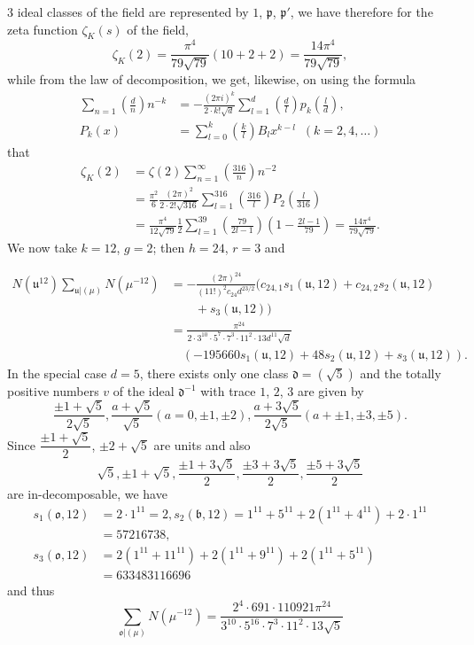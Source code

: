 $3$ ideal classes of the field are represented by $1$, $\mathfrak{p}$,
$\mathfrak{p}'$, we have therefore for the zeta function
$\zeta_{K}(s)$ of the field,
$$
\zeta_{K}(2)=\frac{\pi^{4}}{79\sqrt{79}}(10+2+2)=\frac{14\pi^{4}}{79\sqrt{79}},
$$
while from the law of decomposition, we get, likewise, on using the
formula
\begin{align*}
\sum_{n=1}\left(\frac{d}{n}\right)n^{-k} &= -\frac{(2\pi
  i)^{k}}{2 \cdot
  k!\sqrt{d}}\sum^{d}_{l=1}\left(\frac{d}{l}\right)p_{k}\left(\frac{l}{d}\right),\\
P_{k}(x) &=
\sum^{k}_{l=0}\left(\frac{k}{l}\right)B_{l}x^{k-l}\;\; (k=2,4,\ldots) 
\end{align*}
that
\begin{align*}
\zeta_{K}(2) &=
\zeta(2)\sum^{\infty}_{n=1}\left(\frac{316}{n}\right)n^{-2}\\
&= \frac{\pi^{2}}{6}\frac{(2\pi)^{2}}{2\cdot
  2!\sqrt{316}}\sum^{316}_{l=1}\left(\frac{316}{l}\right)P_{2}\left(\frac{l}{316}\right)\\
&=
\frac{\pi^{4}}{12\sqrt{79}}\frac{1}{2}\sum^{39}_{l=1}\left(\frac{79}{2l-1}\right)\left(1-\frac{2l-1}{79}\right)=\frac{14\pi^{4}}{79\sqrt{79}}. 
\end{align*}
We now take $k=12$, $g=2$; then $h=24$, $r=3$ and 



\begin{align*}
N(\mathfrak{u}^{12})\sum_{\mathfrak{u}|(\mu)}N(\mu^{-12})&=-
\frac{(2\pi)^{24}}{(11!)^{2}c_{24}d^{23/2}}(c_{24,1}s_{1}(\mathfrak{u},12)
+c_{24,2}s_{2}(\mathfrak{u},12)\\
&\qquad+s_{3}(\mathfrak{u},12))\\
&= \frac{\pi^{24}}{2\cdot 3^{10}\cdot 5^{7}\cdot 7^{3}\cdot
    11^{2}\cdot 13d^{11}\sqrt{d}}\\
&\quad(-195660s_{1}(\mathfrak{u},12)+48s_{2}(\mathfrak{u},12)+s_{3}(\mathfrak{u},12)). 
\end{align*}\pageoriginale
In the special case $d=5$, there exists only one class
$\mathfrak{d}=(\sqrt{5})$ and the totally positive numbers $v$ of the
ideal $\mathfrak{d}^{-1}$ with trace $1$, $2$, $3$ are given by
$$\dfrac{\pm 1+\sqrt{5}}{2\sqrt{5}},
\dfrac{a+\sqrt{5}}{\sqrt{5}}(a=0,\pm 1,\pm 2),
\dfrac{a+3\sqrt{5}}{2\sqrt{5}}(a+\pm 1,\pm 3,\pm 5).$$ 
Since
$\dfrac{\pm 1+\sqrt{5}}{2}$, $\pm 2+\sqrt{5}$ are units and also
$$\sqrt{5}, \pm 1+\sqrt{5}, \dfrac{\pm 1+3\sqrt{5}}{2},
\dfrac{\pm 3+3\sqrt{5}}{2}, \dfrac{\pm 5+3\sqrt{5}}{2}$$ are
in-decomposable, we have
\begin{align*}
s_{1}(\mathfrak{o},12) &= 2\cdot 1^{11}=2,
s_{2}(\mathfrak{b},12)=1^{11}+5^{11}+2(1^{11}+4^{11})+2\cdot 1^{11}\\
&= 57216738,\\
s_{3}(\mathfrak{o},12) &=
2(1^{11}+11^{11})+2(1^{11}+9^{11})+2(1^{11}+5^{11})\\
&=633483116696 
\end{align*}
and thus
$$
\sum_{\mathfrak{o}|(\mu)}N(\mu^{-12})=\frac{2^{4}\cdot 691\cdot
  110921\pi^{24}}{3^{10}\cdot 5^{16}\cdot 7^{3}\cdot 11^{2}\cdot
  13\sqrt{5}}
$$

